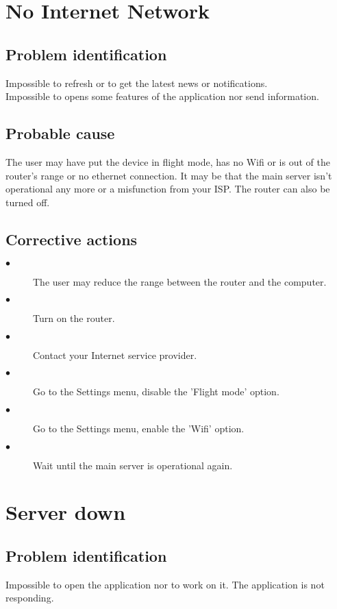 \section{No Internet Network}

\subsection{Problem identification}
Impossible to refresh or to get the latest news or notifications.\\
Impossible to opens some features of the application nor send information.\\

\subsection{Probable cause}
The user may have put the device in flight mode, has no Wifi or is out of the
router's range or no ethernet connection. It may be that the main server isn't
operational any more or a misfunction from your ISP. The router can also be
turned off.

\subsection{Corrective actions}
\begin{description} 
\item[$\bullet$] The user may reduce the range between the router and the
computer.
\item[$\bullet$] Turn on the router.
\item[$\bullet$] Contact your Internet service provider.
\item[$\bullet$] Go to the Settings menu, disable the 'Flight mode' option.
\item[$\bullet$] Go to the Settings menu, enable the 'Wifi' option.
\item[$\bullet$] Wait until the main server is operational again.
\end{description} 

\section{Server down}

\subsection{Problem identification}
Impossible to open the application nor to work on it. The application is not
responding.\\

